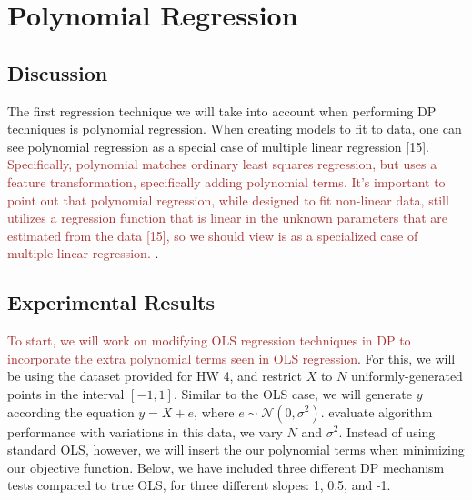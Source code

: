 \documentclass[11pt,conference]{IEEEtran}
\newcommand{\Normal}{\mathcal{N}}
\begin{document}
\section{Polynomial Regression}
\subsection{Discussion}
The first regression technique we will take into account when performing DP techniques is polynomial regression. When creating models to fit to data, one can see polynomial regression as a special case of multiple linear regression [15]. \textcolor{brown}{Specifically, polynomial matches ordinary least squares regression, but uses a feature transformation, specifically adding polynomial terms. It's important to point out that polynomial regression, while designed to fit non-linear data, still utilizes a regression function that is linear in the unknown parameters that are estimated from the data [15], so we should view is as a specialized case of multiple linear regression.}
. 
\subsection{Experimental Results}
\textcolor{brown}{To start, we will work on modifying OLS regression techniques in DP to incorporate the extra polynomial terms seen in OLS regression}. For this, we will be using the dataset provided for HW 4, and restrict $X$ to $N$ uniformly-generated points in the interval $[-1,1]$. Similar to the OLS case, we will generate $y$ according the equation $y=X+e$, where $e\sim \Normal(0,\sigma^2)$. evaluate algorithm performance with variations in this data, we vary $N$ and $\sigma^2$. Instead of using standard OLS, however, we will insert the our polynomial terms when minimizing our objective function. Below, we have included three different DP mechanism tests compared to true OLS, for three different slopes: 1, 0.5, and -1. 
\end{document}
